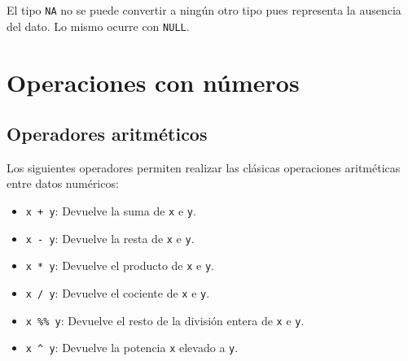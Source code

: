 \documentclass[
  spanish,
  a4paper,
]{scrreport}
\providecommand{\tightlist}{%
  \setlength{\itemsep}{0pt}\setlength{\parskip}{0pt}}
\theoremstyle{definition}
\theoremstyle{definition}
\theoremstyle{remark}
\begin{document}
El tipo \texttt{NA} no se puede convertir a ningún otro tipo pues
representa la ausencia del dato. Lo mismo ocurre con \texttt{NULL}.

\section{Operaciones con números}\label{operaciones-con-nuxfameros}

\subsection{Operadores aritméticos}\label{operadores-aritmuxe9ticos}

Los siguientes operadores permiten realizar las clásicas operaciones
aritméticas entre datos numéricos:

\begin{itemize}
\tightlist
\item
  \texttt{x\ +\ y}: Devuelve la suma de \texttt{x} e \texttt{y}.
\item
  \texttt{x\ -\ y}: Devuelve la resta de \texttt{x} e \texttt{y}.
\item
  \texttt{x\ *\ y}: Devuelve el producto de \texttt{x} e \texttt{y}.
\item
  \texttt{x\ /\ y}: Devuelve el cociente de \texttt{x} e \texttt{y}.\\
\item
  \texttt{x\ \%\%\ y}: Devuelve el resto de la división entera de
  \texttt{x} e \texttt{y}.\\
\item
  \texttt{x\ \^{}\ y}: Devuelve la potencia \texttt{x} elevado a
  \texttt{y}.
\end{itemize}
\end{document}
